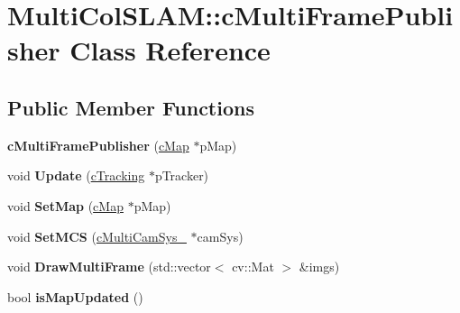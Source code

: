 \hypertarget{classMultiColSLAM_1_1cMultiFramePublisher}{}\section{Multi\+Col\+S\+L\+AM\+:\+:c\+Multi\+Frame\+Publisher Class Reference}
\label{classMultiColSLAM_1_1cMultiFramePublisher}
\subsection*{Public Member Functions}
\begin{DoxyCompactItemize}
\item 
{\bfseries c\+Multi\+Frame\+Publisher} (\hyperlink{classMultiColSLAM_1_1cMap}{c\+Map} $\ast$p\+Map)\hypertarget{classMultiColSLAM_1_1cMultiFramePublisher_ac16afbd71dae5e5bc522172a6410ff05}{}\label{classMultiColSLAM_1_1cMultiFramePublisher_ac16afbd71dae5e5bc522172a6410ff05}

\item 
void {\bfseries Update} (\hyperlink{classMultiColSLAM_1_1cTracking}{c\+Tracking} $\ast$p\+Tracker)\hypertarget{classMultiColSLAM_1_1cMultiFramePublisher_a26be26e719ad3a0c9f3cc8ce57472697}{}\label{classMultiColSLAM_1_1cMultiFramePublisher_a26be26e719ad3a0c9f3cc8ce57472697}

\item 
void {\bfseries Set\+Map} (\hyperlink{classMultiColSLAM_1_1cMap}{c\+Map} $\ast$p\+Map)\hypertarget{classMultiColSLAM_1_1cMultiFramePublisher_a191f96bea32794aaba353aaa0475e2f4}{}\label{classMultiColSLAM_1_1cMultiFramePublisher_a191f96bea32794aaba353aaa0475e2f4}

\item 
void {\bfseries Set\+M\+CS} (\hyperlink{classMultiColSLAM_1_1cMultiCamSys__}{c\+Multi\+Cam\+Sys\+\_\+} $\ast$cam\+Sys)\hypertarget{classMultiColSLAM_1_1cMultiFramePublisher_af1fd066730bf71525b7d491dee0113c8}{}\label{classMultiColSLAM_1_1cMultiFramePublisher_af1fd066730bf71525b7d491dee0113c8}

\item 
void {\bfseries Draw\+Multi\+Frame} (std\+::vector$<$ cv\+::\+Mat $>$ \&imgs)\hypertarget{classMultiColSLAM_1_1cMultiFramePublisher_a0417eb7f78ff9b1629302ae90978d5d5}{}\label{classMultiColSLAM_1_1cMultiFramePublisher_a0417eb7f78ff9b1629302ae90978d5d5}

\item 
bool {\bfseries is\+Map\+Updated} ()\hypertarget{classMultiColSLAM_1_1cMultiFramePublisher_a450064eb16f1c7c8253255fe2fb9cc7a}{}\label{classMultiColSLAM_1_1cMultiFramePublisher_a450064eb16f1c7c8253255fe2fb9cc7a}

\end{DoxyCompactItemize}
